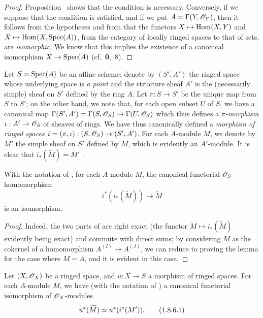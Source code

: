 \begin{proof}
\label{proof-1.1.8.3}
Proposition~ shows that the condition is necessary.
Conversely, if we suppose that the condition is satisfied, and if we put $A=\Gamma(Y,\mathscr{O}_Y)$, then it follows from the hypotheses and from  that the functors $X\mapsto\Hom(X,Y)$ and $X\mapsto\Hom(X,\Spec(A))$, from the category of locally ringed spaces to that of sets, are \emph{isomorphic}.
We know that this implies the existence of a canonical isomorphism $X\to\Spec(A)$ (cf.~\textbf{0},~8).
\end{proof}

\begin{env}[1.8.4]
\label{1.1.8.4}
Let $S=\operatorname{Spec}(A)$ be an affine scheme;
denote by $(S',A')$ the ringed space whose underlying space is \emph{a point} and the structure sheaf $A'$ is the (necessarily simple) sheaf on $S'$ defined by the ring $A$.
Let $\pi:S\to S'$ be the unique map from $S$ to $S'$;
on the other hand, we note that, for each open subset $U$ of $S$, we have a canonical map $\Gamma(S',A')=\Gamma(S,\sh{O}_S)\to\Gamma(U,\sh{O}_S)$ which thus defines a \emph{$\pi$-morphism} $\iota:A'\to\sh{O}_S$ of sheaves of rings.
We have thus canonically defined a \emph{morphism of ringed spaces $i=(\pi,\iota):(S,\sh{O}_S)\to(S',A')$}.
For each $A$-module $M$, we denote by $M'$ the simple sheaf on $S'$ defined by $M$, which is evidently an $A'$-module.
It is clear that $i_*(\widetilde{M})=M'$ .
\end{env}

\begin{lemma}[1.8.5]
\label{1.1.8.5}
With the notation of , for each $A$-module $M$, the canonical functorial $\mathscr{O}_S$-homomorphism 
\[
\label{1.1.8.5.1}
  i^*(i_*(\widetilde{M}))\to\widetilde{M}
  \tag{1.8.5.1}
\]
is an isomorphism.
\end{lemma}

\begin{proof}
\label{proof-1.1.8.5}
Indeed, the two parts of  are right exact (the functor $M\mapsto i_*(\widetilde{M})$ evidently being exact) and commute with direct sums;
by considering $M$ as the cokernel of a homomorphism $A^{(I)}\to A^{(J)}$, we can reduce to proving the lemma for the case where $M=A$, and it is evident in this case.
\end{proof}

\begin{corollary}[1.8.6]
\label{1.1.8.6}
Let $(X,\mathscr{O}_X)$ be a ringed space, and $u:X\to S$ a morphism of ringed spaces.
For each $A$-module $M$, we have (with the notation of ) a canonical functorial isomorphism of $\mathscr{O}_X$-modules
\[
\label{1.1.8.6.1}
  u^*(\widetilde{M})\simeq u^*(i^*(M')).
  \tag{1.8.6.1}
\]
\end{corollary}

